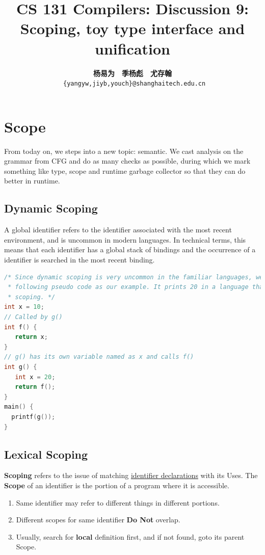 \documentclass[a4paper]{article}
\title{CS 131 Compilers: Discussion 9: Scoping, toy type interface and unification}
\author{\textbf{杨易为}~~\textbf{季杨彪}~~\textbf{尤存翰} \\ \texttt{ \{yangyw,jiyb,youch\}@shanghaitech.edu.cn}}
\theoremstyle{definition}
\begin{document}
\maketitle
\section{Scope}
From today on, we steps into a new topic: semantic. We cast analysis on the grammar from CFG and do as many checks as possible, during which we mark something like type, scope and runtime garbage collector so that they can do better in runtime.
\subsection{Dynamic Scoping}
A global identifier refers to the identifier associated with the most recent environment, and is uncommon in modern languages. In technical terms, this means that each identifier has a global stack of bindings and the occurrence of a identifier is searched in the most recent binding.

\begin{lstlisting}[language=C]
/* Since dynamic scoping is very uncommon in the familiar languages, we consider the 
 * following pseudo code as our example. It prints 20 in a language that uses dynamic
 * scoping. */ 
int x = 10;
// Called by g()
int f() {
   return x;
} 
// g() has its own variable named as x and calls f()
int g() {
   int x = 20;
   return f();
}
main() {
  printf(g());
}
\end{lstlisting}
\subsection{Lexical Scoping}

\textbf{Scoping} refers to the issue of matching \href{https://docs.python.org/zh-cn/3.9/reference/compound_stmts.html#class-definitions}{identifier declarations} with its Uses. The \textbf{Scope} of an identifier is the portion of a program where it is accessible.
\begin{enumerate}
  \item Same identifier may refer to different things in different portions.
  \item Different scopes for same identifier \textbf{Do Not} overlap.
  \item Usually, search for \textbf{local} definition first, and if not found, goto its parent Scope.
\end{enumerate} 
\end{document}
